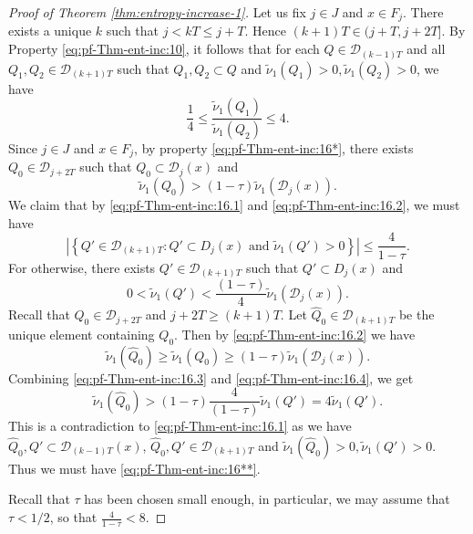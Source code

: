 \documentclass[a4paper,11pt]{amsart}
\theoremstyle{definition}
\numberwithin{equation}{section}
\def\D{\mathcal{D}}
\begin{document}
\begin{proof}[Proof of Theorem \ref{thm:entropy-increase-1}]
{Let us fix $j\in J$ and $x\in F_j$. There exists a unique $k$ such that $j<kT\le j+T$.  Hence $(k+1)T\in (j+T,j+2T]$.  By Property \eqref{eq:pf-Thm-ent-inc:10},   it follows that for each $Q\in \D_{(k-1)T}$ and all $Q_1,Q_2\in \D_{(k+1)T}$ such that $Q_1,Q_2\subset Q$ and $\tilde{\nu}_1(Q_1)>0, \tilde{\nu}_1(Q_2)>0$,  we have 
\begin{equation}\label{eq:pf-Thm-ent-inc:16.1}
\frac{1}{4}\le \frac{\tilde{\nu}_1(Q_1)}{\tilde{\nu}_1(Q_2)} \le 4.
\end{equation}
Since $j\in J$ and $x\in F_j$,  by property \eqref{eq:pf-Thm-ent-inc:16*}, there exists $Q_0\in \D_{j+2T}$ such that $Q_0\subset \D_j(x) $ and 
\begin{equation}\label{eq:pf-Thm-ent-inc:16.2}
\tilde{\nu}_1(Q_0)>(1-\tau)\tilde{\nu}_1(\D_j(x)).
\end{equation}
We claim that by \eqref{eq:pf-Thm-ent-inc:16.1} and \eqref{eq:pf-Thm-ent-inc:16.2}, we must have 
\begin{equation}\label{eq:pf-Thm-ent-inc:16**}
\left| \left\{ Q'\in \D_{(k+1)T}: Q'\subset  D_j(x) \textrm{  and  }   \tilde{\nu}_1(Q')>0  \right\} \right| \le \frac{4}{1-\tau}.
\end{equation}
For otherwise, there exists $ Q'\in \D_{(k+1)T}$ such that $Q'\subset  D_j(x) $ and 
\begin{equation}\label{eq:pf-Thm-ent-inc:16.3}
0<\tilde{\nu}_1(Q')< \frac{(1-\tau)}{4}\tilde{\nu}_1(\D_j(x)).
\end{equation}
Recall that $Q_0\in \D_{j+2T}$ and $j+2T\ge (k+1)T$.   Let $\widehat{Q}_0\in \D_{(k+1)T}$ be the unique element containing $Q_0$. Then by \eqref{eq:pf-Thm-ent-inc:16.2} we have 
\begin{equation}\label{eq:pf-Thm-ent-inc:16.4}
 \tilde{\nu}_1(\widehat{Q}_0) \ge \tilde{\nu}_1(Q_0)\ge (1-\tau) \tilde{\nu}_1(\D_j(x)).
\end{equation}
Combining \eqref{eq:pf-Thm-ent-inc:16.3} and \eqref{eq:pf-Thm-ent-inc:16.4}, we get 
\[
\tilde{\nu}_1(\widehat{Q}_0) > (1-\tau)\frac{4}{(1-\tau)}\tilde{\nu}_1(Q')=4\tilde{\nu}_1(Q').
\]
This is a contradiction to \eqref{eq:pf-Thm-ent-inc:16.1} as we have $\widehat{Q}_0,  Q'\subset  \D_{(k-1)T}(x)$, $\widehat{Q}_0,  Q'\in  \D_{(k+1)T}$  and $\tilde{\nu}_1(\widehat{Q}_0) >0,  \tilde{\nu}_1(Q')>0$.  Thus we must have \eqref{eq:pf-Thm-ent-inc:16**}.

Recall that $\tau$ has been chosen small enough, in particular, we may assume that $\tau<1/2$,   so that $\frac{4}{1-\tau}<8$.

}
\end{proof}
\end{document}
